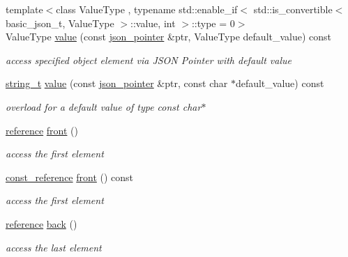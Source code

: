 \begin{DoxyCompactItemize}
{\footnotesize template$<$class Value\+Type , typename std\+::enable\+\_\+if$<$ std\+::is\+\_\+convertible$<$ basic\+\_\+json\+\_\+t, Value\+Type $>$\+::value, int $>$\+::type  = 0$>$ }\\Value\+Type \mbox{\hyperlink{classnlohmann_1_1basic__json_ab7df4291dda0a80d86f74427cc3993ba}{value}} (const \mbox{\hyperlink{classnlohmann_1_1basic__json_1_1json__pointer}{json\+\_\+pointer}} \&ptr, Value\+Type default\+\_\+value) const
\begin{DoxyCompactList}\small\item\em access specified object element via J\+S\+ON Pointer with default value \end{DoxyCompactList}\item 
\mbox{\hyperlink{classnlohmann_1_1basic__json_a61f8566a1a85a424c7266fb531dca005}{string\+\_\+t}} \mbox{\hyperlink{classnlohmann_1_1basic__json_a869c900ee02cf1a68988dcce3b375424}{value}} (const \mbox{\hyperlink{classnlohmann_1_1basic__json_1_1json__pointer}{json\+\_\+pointer}} \&ptr, const char $\ast$default\+\_\+value) const
\begin{DoxyCompactList}\small\item\em overload for a default value of type const char$\ast$ \end{DoxyCompactList}\item 
\mbox{\hyperlink{classnlohmann_1_1basic__json_ac6a5eddd156c776ac75ff54cfe54a5bc}{reference}} \mbox{\hyperlink{classnlohmann_1_1basic__json_a3acba9c6ceb7214e565fe08c3ba5b352}{front}} ()
\begin{DoxyCompactList}\small\item\em access the first element \end{DoxyCompactList}\item 
\mbox{\hyperlink{classnlohmann_1_1basic__json_a4057c5425f4faacfe39a8046871786ca}{const\+\_\+reference}} \mbox{\hyperlink{classnlohmann_1_1basic__json_a4b1fb3671ade9afc8d33b2c9510acbfc}{front}} () const
\begin{DoxyCompactList}\small\item\em access the first element \end{DoxyCompactList}\item 
\mbox{\hyperlink{classnlohmann_1_1basic__json_ac6a5eddd156c776ac75ff54cfe54a5bc}{reference}} \mbox{\hyperlink{classnlohmann_1_1basic__json_a011397134847f36db0ed7d7a93753677}{back}} ()
\begin{DoxyCompactList}\small\item\em access the last element \end{DoxyCompactList}\item 

\end{DoxyCompactItemize}
